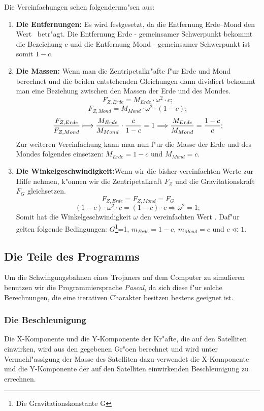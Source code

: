 Die Vereinfachungen sehen folgenderma"sen aus:
\begin{enumerate}
\item{\bf Die Entfernungen:} Es wird festgesetzt, da\3 die Entfernung Erde--Mond den Wert
\grq\ betr"agt. Die Entfernung Erde - gemeinsamer Schwerpunkt bekommt die
Bezeichung $c$ und die Entfernung Mond - gemeinsamer Schwerpunkt ist somit $1-c$.
\item{\bf Die Massen:} Wenn man die Zentripetalkr"afte f"ur Erde und Mond berechnet und
die beiden entstehenden Gleichungen dann dividiert bekommt man eine Beziehung
zwischen den Massen der Erde und des Mondes.
$$F_{Z,Erde}=M_{Erde}\cdot\omega^2\cdot c;$$
$$F_{Z,Mond}=M_{Mond}\cdot\omega^2\cdot (1-c);$$
$$\frac{F_{Z,Erde}}{F_{Z,Mond}}\longmapsto{M_{Erde}\over M_{Mond}}\cdot\frac{c}{1-c}=1
\Longrightarrow \frac{M_{Erde}}{M_{Mond}}=\frac{1-c}{c};$$
Zur weiteren Vereinfachung kann man nun f"ur die Masse der Erde und des Mondes
folgendes einsetzen: $M_{Erde}=1-c$ und $M_{Mond}=c$.
\item{\bf Die Winkelgeschwindigkeit:}Wenn wir die bisher vereinfachten Werte zur
Hilfe nehmen, k"onnen wir die Zentripetalkraft $F_Z$ und die Gravitationskraft $F_G$
gleichsetzen.
$$F_{Z,Erde}=F_{Z,Mond}=F_G$$
$$(1-c)\cdot\omega^2\cdot c=(1-c)\cdot c\Longrightarrow \omega^2=1;$$
Somit hat die Winkelgeschwindigkeit $\omega$ den vereinfachten Wert \grq .
Daf"ur gelten folgende Bedingungen: $G$\footnote{Die Gravitationskonstante
G}=1, $m_{Erde}=1-c$, $m_{Mond}=c$ und $c \ll 1$.
\end{enumerate}
\subsection{Die Teile des Programms}
Um die Schwingungsbahnen eines Trojaners auf dem Computer zu simulieren benutzen wir
die Programmiersprache {\it Pascal}, da sich diese f"ur solche Berechnungen, die eine
iterativen Charakter besitzen bestens geeignet ist.

\subsubsection{Die Beschleunigung}
Die X-Komponente und die Y-Komponente der Kr"afte, die auf den Satelliten einwirken,
wird aus den gegebenen Gr"o\3en berechnet und wird unter Vernachl"assigung der Masse
des Satelliten dazu verwendet die X-Komponente und die Y-Komponente der auf den
Satelliten einwirkenden Beschleunigung zu errechnen. 

